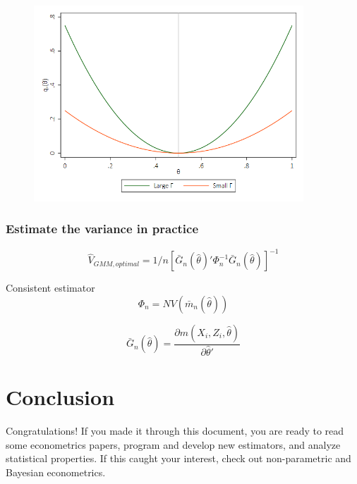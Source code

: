 \documentclass[a4paper,12pt]{article}
\begin{document}
\begin{figure}[H]
	\centering
		\includegraphics[width=0.90\textwidth]{figures/gamma}
	\label{fig:Gamma}
\end{figure}



\subsubsection*{Estimate the variance in practice}
$$\hat{V}_{GMM,optimal}=1/n[\bar{G}_n(\hat{\theta})'\Phi_n^{-1}\bar{G}_n(\hat{\theta})]^{-1}$$

Consistent estimator
$$\Phi_n=NV(\bar{m}_n(\hat{\theta}))$$

$$\bar{G}_n(\hat{\theta})=\frac{\partial m(X_i,Z_i,\hat{\theta})}{\partial \hat{\theta}'}$$







\clearpage
\section{Conclusion}
\label{sec: Conclusion}
Congratulations! If you made it through this document, you are ready to read some econometrics papers, program and develop new estimators, and analyze statistical properties. If this caught your interest, check out non-parametric and Bayesian econometrics.

\newpage
{}
{}
\nocite{*}

\end{document}
